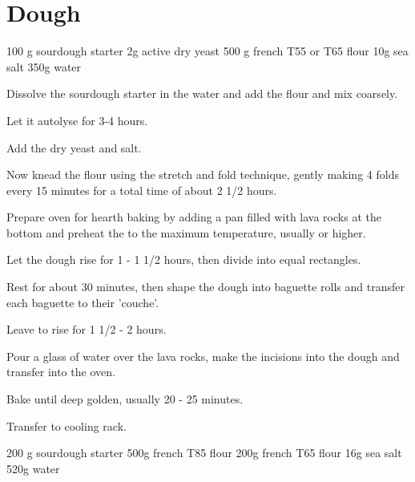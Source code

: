 \chapter{Dough}
\minitoc

\label{rec:bread-baguette}

\begin{ingreds}
	100 g sourdough starter
	2g active dry yeast
	500 g french T55 or T65 flour
	10g sea salt
	350g water

\end{ingreds}

\begin{method}		
     	Dissolve the sourdough starter in the water and add the flour and mix coarsely.

	Let it autolyse for 3-4 hours.

	Add the dry yeast and salt.

	Now knead the flour using the stretch and fold technique, gently making 4 folds  every 15 minutes for a total time of about 2 1/2 hours.

	Prepare oven for hearth baking by adding a pan filled with lava rocks at the bottom and preheat the to the maximum temperature, usually  or higher.

	Let the dough rise for 1 - 1 1/2 hours, then divide into equal rectangles.

	Rest for about 30 minutes, then shape the dough into baguette rolls and transfer each baguette to their 'couche'.

	Leave to rise for 1 1/2 - 2 hours.

	Pour a glass of water over the lava rocks, make the incisions into the dough and transfer into the oven.

	Bake until deep golden,  usually 20 - 25 minutes.

	Transfer to cooling rack.

\end {method}

\label{rec:bread-campagne}

\begin{ingreds}
	200 g sourdough starter
	500g french T85 flour
	200g french T65 flour
	16g sea salt
	520g water
\end{ingreds}


